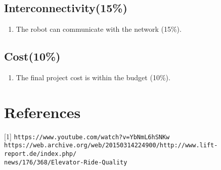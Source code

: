 \documentclass[12pt]{article}
\begin{document}
	\subsection{Interconnectivity(15\%)}
		\begin{enumerate}
			\item The robot can communicate with the network (15\%).
		\end{enumerate}
	
	\subsection{Cost(10\%)}
		\begin{enumerate}
			\item The final project cost is within the budget (10\%).
		\end{enumerate}
	
\section{References}
[1] \texttt{https://www.youtube.com/watch?v=YbNmL6hSNKw}
	\texttt{https://web.archive.org/web/20150314224900/http://www.lift-report.de/index.php/\\news/176/368/Elevator-Ride-Quality}
	
\end{document}
